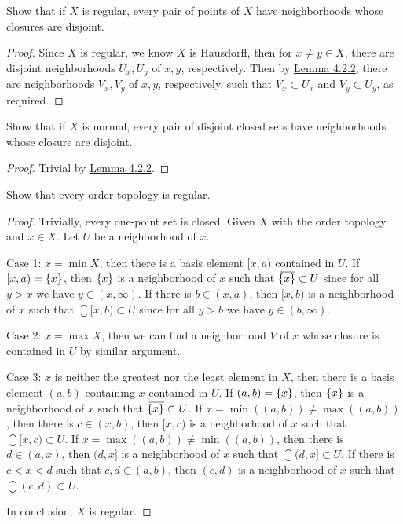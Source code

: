 \documentclass[12pt,a4paper]{article}
\begin{document}
    \begin{ex}
        Show that if $X$ is regular, every pair of points of $X$ have neighborhoods whose closures are disjoint.
    \end{ex}
    \begin{proof}
        Since $X$ is regular, we know $X$ is Hausdorff, then for $x\neq y\in X$, there are disjoint neighborhoods $U_x,U_y$ of $x,y$, respectively. Then by \hyperref[4.2.2]{Lemma 4.2.2}, there are neighborhoods $V_x,V_y$ of $x,y$, respectively, such that $\bar{V_x}\subset U_x$ and $\bar{V_y}\subset U_y$, as required.
    \end{proof}
    \hfill

    \begin{ex}
        Show that if $X$ is normal, every pair of disjoint closed sets have neighborhoods whose closure are disjoint.
    \end{ex}
    \begin{proof}
        Trivial by \hyperref[4.2.2]{Lemma 4.2.2}.
    \end{proof}
    \hfill

    \begin{ex}
        Show that every order topology is regular.
    \end{ex}
    \begin{proof}
        Trivially, every one-point set is closed. Given $X$ with the order topology and $x\in X$. Let $U$ be a neighborhood of $x$.
        
        Case 1: $x=\min X$, then there is a basis element $[x,a)$ contained in $U$. If $[x,a)=\left\{x\right\}$, then $\left\{x\right\}$ is a neighborhood of $x$ such that ${}\mkern3mu\overline{\mkern-3mu\left\{x\right\}}\subset U$ since for all $y>x$ we have $y\in(x,\infty)$. If there is $b\in(x,a)$, then $[x,b)$ is a neighborhood of $x$ such that $\closure{[x,b)}\subset U$ since for all $y>b$ we have $y\in(b,\infty)$.

        Case 2: $x=\max X$, then we can find a neighborhood $V$ of $x$ whose closure is contained in $U$ by similar argument.

        Case 3: $x$ is neither the greatest nor the least element in $X$, then there is a basis element $(a,b)$ containing $x$ contained in $U$. If $(a,b)=\left\{x\right\}$, then $\left\{x\right\}$ is a neighborhood of $x$ such that ${}\mkern3mu\overline{\mkern-3mu\left\{x\right\}}\subset U$. If $x=\min((a,b))\neq\max((a,b))$, then there is $c\in (x,b)$, then $[x,c)$ is a neighborhood of $x$ such that $\closure{[x,c)}\subset U$. If $x=\max((a,b))\neq\min((a,b))$, then there is $d\in (a,x)$, then $(d,x]$ is a neighborhood of $x$ such that $\closure{(d,x]}\subset U$. If there is $c<x<d$ such that $c,d\in(a,b)$, then $(c,d)$ is a neighborhood of $x$ such that $\closure{(c,d)}\subset U$.

        In conclusion, $X$ is regular.
    \end{proof}
    \hfill
\end{document}
